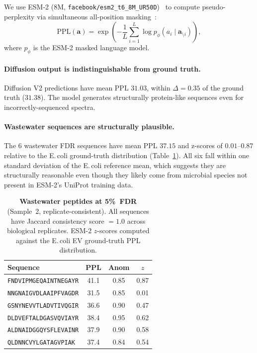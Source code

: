 \documentclass[10pt,twocolumn]{article}
\newcommand{\vect}[1]{\mathbf{#1}}
\begin{document}
We use ESM-2 (8M, \texttt{facebook/esm2\_t6\_8M\_UR50D})~\citep{lin2023evolutionary} to compute
pseudo-perplexity via simultaneous all-position masking~\citep{kantroo2024}:
\begin{equation}
  \mathrm{PPL}(\vect{a}) = \exp\!\left(-\frac{1}{L}\sum_{i=1}^{L}
    \log p_{\phi}(a_i \mid \vect{a}_{\setminus i})\right),
  \label{eq:ppl}
\end{equation}
where $p_\phi$ is the ESM-2 masked language model.

\paragraph{Diffusion output is indistinguishable from ground truth.}
Diffusion V2 predictions have mean PPL $31.03$, within $\Delta = 0.35$ of the ground truth ($31.38$).
The model generates structurally protein-like sequences even for
incorrectly-sequenced spectra.

\paragraph{Wastewater sequences are structurally plausible.}
The 6 wastewater FDR sequences have mean PPL $37.15$ and z-scores of $0.01$--$0.87$ relative
to the E.\,coli ground-truth distribution (Table~\ref{tab:wastewater}).
All six fall within one standard deviation of the E.\,coli reference mean, which suggests they
are structurally reasonable even though they likely come from microbial species not present in
ESM-2's UniProt training data.

\begin{table}[h]
  \centering
  \caption{
    \textbf{Wastewater peptides at 5\%~FDR} (Sample~2, replicate-consistent).
    All sequences have Jaccard consistency score $= 1.0$ across biological replicates.
    ESM-2 $z$-scores computed against the E.\,coli EV ground-truth PPL distribution.
  }
  \label{tab:wastewater}
  \scriptsize
  \setlength{\tabcolsep}{3pt}
  \begin{tabular}{lccc}
    \toprule
    Sequence & PPL & Anom & $z$ \\
    \midrule
    \texttt{FNDVIPMGEQAINTNEGAYR} & 41.1 & 0.85 & 0.87 \\
    \texttt{NNGNAIGVDLAAIPFVAGDR} & 31.5 & 0.85 & 0.01 \\
    \texttt{GSNYNEVVTLADVTIVQGIR} & 36.6 & 0.90 & 0.47 \\
    \texttt{DLDVEFTALDGASVQVIAYR} & 38.4 & 0.95 & 0.62 \\
    \texttt{ALDNAIDGGQYSFLEVAINR} & 37.9 & 0.90 & 0.58 \\
    \texttt{QLDNNCVYLGATAGVPIAK}  & 37.4 & 0.84 & 0.54 \\
    \bottomrule
  \end{tabular}
\end{table}
\end{document}
